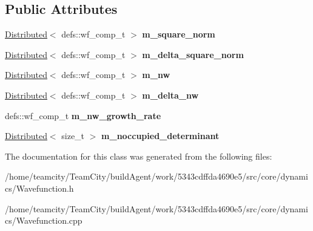 \subsection*{Public Attributes}
\begin{DoxyCompactItemize}
\item 
\hyperlink{classDistributed}{Distributed}$<$ defs\+::wf\+\_\+comp\+\_\+t $>$ {\bfseries m\+\_\+square\+\_\+norm}\hypertarget{classWavefunction_a2b12b433ab467212f61c04df45c0047d}{}\label{classWavefunction_a2b12b433ab467212f61c04df45c0047d}

\item 
\hyperlink{classDistributed}{Distributed}$<$ defs\+::wf\+\_\+comp\+\_\+t $>$ {\bfseries m\+\_\+delta\+\_\+square\+\_\+norm}\hypertarget{classWavefunction_a383c80d45c0e7524c530846fbd451b5c}{}\label{classWavefunction_a383c80d45c0e7524c530846fbd451b5c}

\item 
\hyperlink{classDistributed}{Distributed}$<$ defs\+::wf\+\_\+comp\+\_\+t $>$ {\bfseries m\+\_\+nw}\hypertarget{classWavefunction_a6bccdad37bae72a28cee4d377365c3be}{}\label{classWavefunction_a6bccdad37bae72a28cee4d377365c3be}

\item 
\hyperlink{classDistributed}{Distributed}$<$ defs\+::wf\+\_\+comp\+\_\+t $>$ {\bfseries m\+\_\+delta\+\_\+nw}\hypertarget{classWavefunction_a69206a03e11a812637effe3ecaf521f7}{}\label{classWavefunction_a69206a03e11a812637effe3ecaf521f7}

\item 
defs\+::wf\+\_\+comp\+\_\+t {\bfseries m\+\_\+nw\+\_\+growth\+\_\+rate}\hypertarget{classWavefunction_a6c552cea17328ae24225dbb71b79c2f9}{}\label{classWavefunction_a6c552cea17328ae24225dbb71b79c2f9}

\item 
\hyperlink{classDistributed}{Distributed}$<$ size\+\_\+t $>$ {\bfseries m\+\_\+noccupied\+\_\+determinant}\hypertarget{classWavefunction_aa208d094aea1ca0ad8d56f1ff5a05e00}{}\label{classWavefunction_aa208d094aea1ca0ad8d56f1ff5a05e00}

\end{DoxyCompactItemize}


The documentation for this class was generated from the following files\+:\begin{DoxyCompactItemize}
\item 
/home/teamcity/\+Team\+City/build\+Agent/work/5343cdffda4690e5/src/core/dynamics/Wavefunction.\+h\item 
/home/teamcity/\+Team\+City/build\+Agent/work/5343cdffda4690e5/src/core/dynamics/Wavefunction.\+cpp\end{DoxyCompactItemize}
